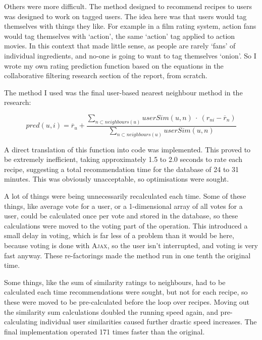 Others were more difficult. The method designed to recommend recipes to users was designed to work on tagged users. The idea here was that users would tag themselves with things they like. For example in a film rating system, action fans would tag themselves with `action', the same `action' tag applied to action movies. In this context that made little sense, as people are rarely `fans' of individual ingredients, and no-one is going to want to tag themselves `onion'. So I wrote my own rating prediction function based on the equations in the collaborative filtering research section of the report, from scratch.

The method I used was the final user-based nearest neighbour method in the research:

\begin{equation}\label{eq:avgadjust}
pred(u,i) = \overline {r}_u + \frac{\sum_{n\subset neighbours(u)} userSim(u,n)~\cdot~(r_{ni}-\overline {r}_n)}{\sum_{n\subset 
neighbours(u)}userSim(u,n)}
\end{equation}

A direct translation of this function into code was implemented. This proved to be extremely inefficient, taking approximately 1.5 to 2.0 seconds to rate each recipe, suggesting a total recommendation time for the database of 24 to 31 minutes. This was obviously unacceptable, so optimisations were sought.

A lot of things were being unnecessarily recalculated each time. Some of these things, like average vote for a user, or a 1-dimensional array of all votes for a user, could be calculated once per vote and stored in the database, so these calculations were moved to the voting part of the operation. This introduced a small delay in voting, which is far less of a problem than it would be here, because voting is done with \textsc{Ajax}, so the user isn't interrupted, and voting is very fast anyway. These re-factorings made the method run in one tenth the original time.

Some things, like the sum of similarity ratings to neighbours, had to be calculated each time recommendations were sought, but not for each recipe, so these were moved to be pre-calculated before the loop over recipes. Moving out the similarity sum calculations doubled the running speed again, and pre-calculating individual user similarities caused further drastic speed increases. The final implementation operated 171 times faster than the original.


